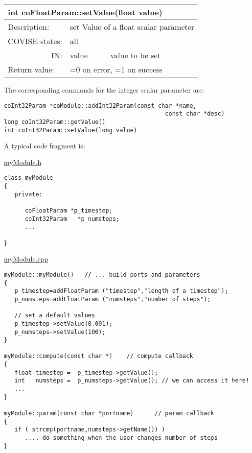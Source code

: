 \begin{longtable}{|p{4cm}|p{2.5cm}|p{7cm}|}
\hline
\multicolumn{3}{|p{13.5cm}|}{\bf int coFloatParam::setValue(float value)} \\
\hline
{Description:}   
                        & \multicolumn{2}{|p{9.5cm}|}{set Value of a float scalar parameter} \\
\hline
{COVISE states:} & \multicolumn{2}{|p{9.5cm}|}{all} \\
\hline
\multicolumn{1}{|r|}{IN:} & {value} 
                             & {value to be set}\\
\hline
{Return value:}  
                        & \multicolumn{2}{|p{9.5cm}|}{=0 on error, =1 on success} \endhead
\hline
\end{longtable}


The corresponding commands for the integer scalar parameter are:

\begin{verbatim}
coInt32Param *coModule::addInt32Param(const char *name,
                                              const char *desc)
long coInt32Param::getValue()
int coInt32Param::setValue(long value)
\end{verbatim}
 

A typical code fragment is:

\underline{myModule.h}

\begin{verbatim}
class myModule
{
   private:

      coFloatParam *p_timestep;
      coInt32Param   *p_numsteps;
      ...
        
}
\end{verbatim} 

\underline{myModule.cpp}

\begin{verbatim}
myModule::myModule()   // ... build ports and parameters
{
   p_timestep=addFloatParam ("timestep","length of a timestep");
   p_numsteps=addFloatParam ("numsteps","number of steps");
  
   // set a default values
   p_timestep->setValue(0.001);
   p_numsteps->setValue(100);
}

myModule::compute(const char *)    // compute callback
{
   float timestep =  p_timestep->getValue();
   int   numsteps =  p_numsteps->getValue(); // we can access it here!
   ...
}

myModule::param(const char *portname)      // param callback
{
   if ( strcmp(portname,numsteps->getName()) )  
      .... do something when the user changes number of steps
}
\end{verbatim}



